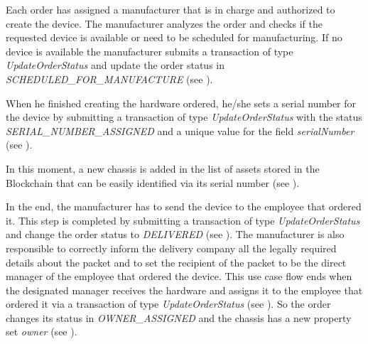 Each order has assigned a manufacturer that is in charge and authorized to create the device.
The manufacturer analyzes the order and checks if the requested device is available or need to be scheduled for manufacturing. If no device is available the manufacturer submits a transaction of type \emph{UpdateOrderStatus} and update the order status in \emph{SCHEDULED_FOR_MANUFACTURE} (see ). 


When he finished creating the hardware ordered, he/she sets a serial number for the device by submitting a transaction of type \emph{UpdateOrderStatus} with the status \emph{SERIAL_NUMBER_ASSIGNED} and a unique value for the field \emph{serialNumber} (see ).


In this moment, a new chassis is added in the list of assets stored in the Blockchain that can be easily identified via its serial number (see ).


In the end, the manufacturer has to send the device to the employee that ordered it. This step is completed by submitting a transaction of type \emph{UpdateOrderStatus} and change the order status to \emph{DELIVERED} (see ). The manufacturer is also responsible to correctly inform the delivery company all the legally required details about the packet and to set the recipient of the packet to be the direct manager of the employee that ordered the device. 
This use case flow ends when the designated manager receives the hardware and assigns it to the employee that ordered it via a transaction of type \emph{UpdateOrderStatus} (see ). So the order changes its status in \emph{OWNER_ASSIGNED} and the chassis has a new property set \emph{owner} (see ).
 

